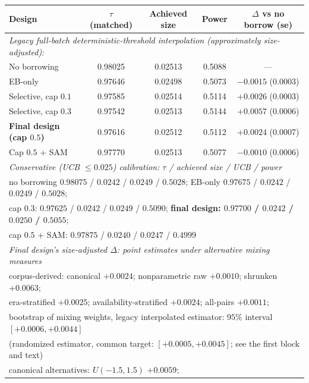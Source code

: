 \documentclass[11pt]{article}
\begin{document}
\begin{table}[htbp]
\vspace{0.7em}

\setlength{\tabcolsep}{4pt}
\begin{tabular}{lcccc}
\hline
Design & $\tau$ (matched) & Achieved size & Power & $\Delta$ vs no borrow
(se) \\
\hline
\multicolumn{5}{l}{\emph{Legacy full-batch deterministic-threshold
interpolation (approximately size-adjusted):}}\\
No borrowing & 0.98025 & 0.02513 & 0.5088 & --- \\
EB-only & 0.97646 & 0.02498 & 0.5073 & $-0.0015$ (0.0003) \\
Selective, cap $0.1$ & 0.97585 & 0.02514 & 0.5114 & $+0.0026$ (0.0003) \\
Selective, cap $0.3$ & 0.97542 & 0.02513 & 0.5144 & $+0.0057$ (0.0006) \\
\textbf{Final design (cap $0.5$)} & 0.97616 & 0.02512 & 0.5112 &
$+0.0024$ (0.0007) \\
Cap $0.5$ + SAM & 0.97770 & 0.02513 & 0.5077 & $-0.0010$ (0.0006) \\
\hline
\multicolumn{5}{l}{\emph{Conservative (UCB $\le 0.025$) calibration:
$\tau$ / achieved size / UCB / power}}\\
\multicolumn{5}{l}{no borrowing $0.98075$ / $0.0242$ / $0.0249$ /
$0.5028$; \quad EB-only $0.97675$ / $0.0242$ / $0.0249$ / $0.5028$;}\\
\multicolumn{5}{l}{cap $0.3$: $0.97625$ / $0.0242$ / $0.0249$ / $0.5090$;
\quad \textbf{final design: $0.97700$ / $0.0242$ / $0.0250$ /
$0.5055$};}\\
\multicolumn{5}{l}{cap $0.5$ + SAM: $0.97875$ / $0.0240$ / $0.0247$ /
$0.4999$}\\
\hline
\multicolumn{5}{l}{\emph{Final design's size-adjusted $\Delta$: point
estimates under alternative mixing measures}}\\
\multicolumn{5}{l}{corpus-derived: canonical $+0.0024$; nonparametric raw
$+0.0010$; shrunken $+0.0063$;}\\
\multicolumn{5}{l}{\quad era-stratified $+0.0025$; availability-stratified
$+0.0024$; all-pairs $+0.0011$;}\\
\multicolumn{5}{l}{\quad bootstrap of mixing weights, legacy
interpolated estimator: $95\%$ interval $[+0.0006, +0.0044]$}\\
\multicolumn{5}{l}{\quad (randomized estimator, common target:
$[+0.0005, +0.0045]$; see the first block and text)}\\
\multicolumn{5}{l}{canonical alternatives: $U(-1.5,1.5)$ $+0.0059$;
}
\end{tabular}
\end{table}
\end{document}
